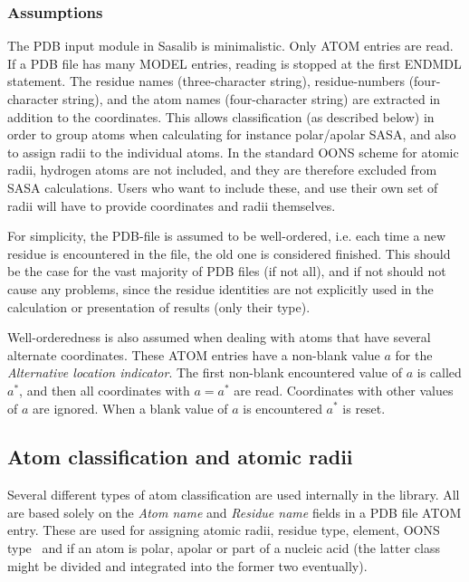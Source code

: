 \documentclass[a4paper,11pt]{article}
\begin{document}
\subsubsection{Assumptions}

The PDB input module in Sasalib is minimalistic. Only ATOM entries are
read. If a PDB file has many MODEL entries, reading is stopped at the
first ENDMDL statement. The residue names (three-character string),
residue-numbers (four-character string), and the atom names
(four-character string) are extracted in addition to the
coordinates. This allows classification (as described below) in order
to group atoms when calculating for instance polar/apolar SASA, and
also to assign radii to the individual atoms. In the standard OONS
scheme for atomic radii, hydrogen atoms are not included, and they are
therefore excluded from SASA calculations. Users who want to include
these, and use their own set of radii will have to provide coordinates
 and radii themselves.

For simplicity, the PDB-file is assumed to be well-ordered, i.e. each
time a new residue is encountered in the file, the old one is
considered finished. This should be the case for the vast majority of
PDB files (if not all), and if not should not cause any problems,
since the residue identities are not explicitly used in the
calculation or presentation of results (only their type). 

Well-orderedness is also assumed when dealing with atoms that have
several alternate coordinates. These ATOM entries have a non-blank
value $a$ for the \emph{Alternative location indicator}. The first
non-blank encountered value of $a$ is called $a^*$, and then all
coordinates with $a = a^*$ are read. Coordinates with other values of
$a$ are ignored. When a blank value of $a$ is encountered $a^*$ is
reset.

\subsection{Atom classification and atomic radii}

Several different types of atom classification are used internally in
the library. All are based solely on the \emph{Atom name} and
\emph{Residue name} fields in a PDB file ATOM entry. These are used
for assigning atomic radii, residue type, element, OONS
type~\cite{OONS} and if an atom is polar, apolar or part of a nucleic
acid (the latter class might be divided and integrated into the former
two eventually).
\end{document}
